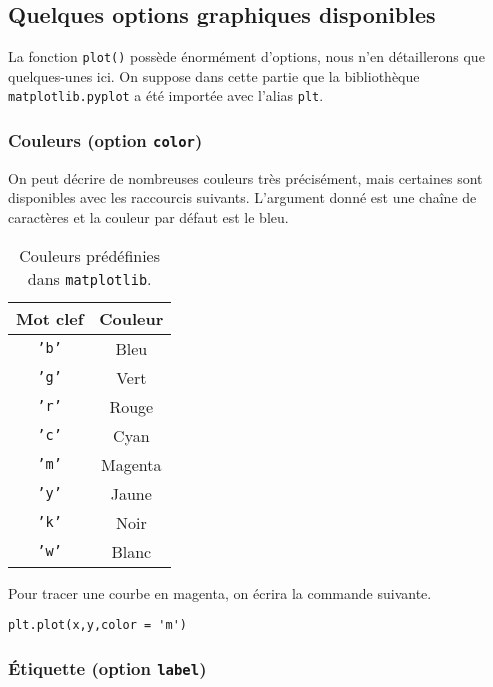\subsection{Quelques options graphiques disponibles}

La fonction \texttt{plot()} possède énormément d'options, nous n'en détaillerons que quelques-unes ici. On suppose dans 
cette partie que la bibliothèque \texttt{matplotlib.pyplot} a été importée avec l'alias \texttt{plt}.

\subsubsection{Couleurs (option \texttt{color})}

On peut décrire de nombreuses couleurs très précisément, mais certaines sont disponibles avec les raccourcis suivants. 
L'argument donné est une chaîne de caractères et la couleur par défaut est le bleu. 

\begin{table}[!h]
  \begin{center}
    \begin{tabular}{|c|c|}
      \hline
      Mot clef & Couleur \\
      \hline 
      \texttt{'b'} & Bleu \\
      \hline 
      \texttt{'g'} & Vert \\
      \hline 
      \texttt{'r'} & Rouge \\
      \hline 
      \texttt{'c'} & Cyan \\
      \hline 
      \texttt{'m'} & Magenta \\
      \hline 
      \texttt{'y'} & Jaune \\
      \hline 
      \texttt{'k'} & Noir \\
      \hline 
      \texttt{'w'} & Blanc \\
      \hline
    \end{tabular}
    \caption{Couleurs prédéfinies dans \texttt{matplotlib}.}
  \end{center}
\end{table}
\begin{exemple}
  Pour tracer une courbe en magenta, on écrira la commande suivante.
\begin{lstlisting}
plt.plot(x,y,color = 'm')
\end{lstlisting}
\end{exemple}

\subsubsection{Étiquette (option \texttt{label})}


